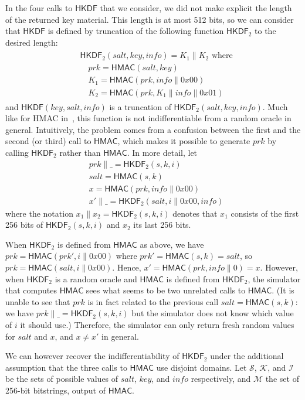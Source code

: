 \documentclass[compsoc, conference, letterpaper, 10pt, times]{IEEEtran}
\newcommand{\HKDF}{\mathsf{HKDF}}
\newcommand{\hkdftwo}{\HKDF_2}
\newcommand{\salt}{\mathit{salt}}
\newcommand{\key}{\mathit{key}}
\newcommand{\info}{\mathit{info}}
\newcommand{\prk}{\mathit{prk}}
\newcommand{\hmac}{\mathsf{HMAC}}
\newcommand{\Ssalt}{\mathcal{S}}
\newcommand{\Skey}{\mathcal{K}}
\newcommand{\Sinfo}{\mathcal{I}}
\newcommand{\Smac}{\mathcal{M}}
\begin{document}
In the four calls to $\HKDF$ that we consider, we did not make explicit 
the length of the returned key material. This length is at most 512 bits, 
so we can consider that $\HKDF$ is defined by truncation of the following function $\hkdftwo$ to the desired length:
\begin{align}
\begin{split}
&\hkdftwo(\salt,\key,\info) = K_1 \| K_2 \text{ where}\\
&\quad \prk = \hmac(\salt,\key)\\
&\quad K_1 = \hmac(\prk, \info \| 0x00)\\
&\quad K_2 = \hmac(\prk, K_1 \| \info \| 0x01)
\end{split}\label{eq:hkdf2}
\end{align}
and $\HKDF(\key,\salt,\info)$ is a truncation of $\hkdftwo(\salt,\key,\info)$.
Much like for HMAC in~\cite{Dodis12}, this function is not indifferentiable from a random oracle in general. Intuitively, the problem comes from a confusion between the first and the second (or third) call to $\hmac$, which makes it possible to generate $\prk$ by calling $\hkdftwo$ rather than $\hmac$. In more detail, let
\begin{align*}
&\prk \|\_ = \hkdftwo(s,k,i)\\
&\salt = \hmac(s,k)\\
&x = \hmac(\prk,\info\|0x00)\\
&x' \|\_ = \hkdftwo(\salt,i\|0x00,\info)
\end{align*}
where the notation $x_1 \|x_2 = \hkdftwo(s,k,i)$
denotes that $x_1$ consists of the first 256 bits of $\hkdftwo(s,k,i)$ 
and $x_2$ its last 256 bits.

When $\hkdftwo$ is defined from $\hmac$ as above, we have 
$\prk = \hmac(\prk', i\|0x00)$ where $\prk' = \hmac(s,k) = \salt$,
so $\prk = \hmac(\salt,i\|0x00)$. Hence, $x' = \hmac(\prk,\info\|0) = x$.
However, when $\hkdftwo$ is a random oracle and $\hmac$ is defined
from $\hkdftwo$, the simulator that computes $\hmac$ sees what seems
to be two unrelated calls to $\hmac$. (It is unable to see that $\prk$
is in fact related to the previous call $\salt = \hmac(s,k)$: we have 
$\prk \|\_ = \hkdftwo(s,k,i)$ but the simulator does not know which value
of $i$ it should use.) Therefore, the simulator can only return fresh random
values for $\salt$ and $x$, and $x \neq x'$ in general.

We can however recover the indifferentiability of $\hkdftwo$ under the 
additional assumption that the three calls to $\hmac$ use disjoint domains.
Let $\Ssalt$, $\Skey$, and $\Sinfo$ be the sets of possible values of $\salt$, 
$\key$, and $\info$ respectively, and $\Smac$ the set of 256-bit bitstrings,
output of $\hmac$.
\end{document}
